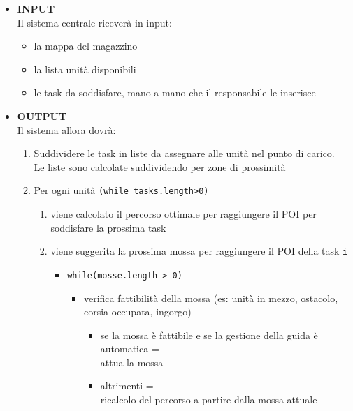 \begin{itemize}
	\item{\textbf{INPUT}\\
	Il sistema centrale riceverà in input:
	\begin{itemize}
		\item{la mappa del magazzino\\}
		\item{la lista unità disponibili\\}
		\item{le task da soddisfare, mano a mano che il responsabile le inserisce\\}
	\end{itemize}
	}
	\item{\textbf{OUTPUT}\\
	Il sistema allora dovrà:
	\begin{enumerate}
		\item{Suddividere le task in liste da assegnare alle unità nel punto di carico. \\
		Le liste sono calcolate suddividendo per zone di prossimità\\}
		\item{Per ogni unità \texttt{(while tasks.length>0)}\\}
		\begin{enumerate}
			\item{viene calcolato il percorso ottimale per raggiungere il POI per soddisfare la prossima task\\}
			\item{viene suggerita la prossima mossa per raggiungere il POI della task \texttt{i}\\}	
			\begin{itemize}
				\item{\texttt{while(mosse.length > 0)}\\}
				\begin{itemize}
					\item{verifica fattibilità della mossa (es: unità in mezzo, ostacolo, corsia occupata, ingorgo)\\}
					\begin{itemize}
						\item{se la mossa è fattibile e se la gestione della guida è automatica = \\
						 attua la mossa\\}
						\item{altrimenti = \\
						ricalcolo del percorso a partire dalla mossa attuale\\}									\end{itemize}

\end{itemize}
\end{itemize}
\end{enumerate}
\end{enumerate}}
\end{itemize}

